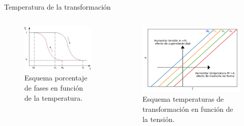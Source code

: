 \documentclass[11pt]{beamer}
\begin{document}
		\begin{frame}{Temperatura de la transformación}
			\begin{columns}[T]
				\begin{column}{.49\textwidth}
					\begin{figure}
						\includegraphics[scale=0.5]{img/Sma_wire.jpeg}
						\caption*{Esquema porcentaje de fases en función de la temperatura.}
					\end{figure}
				\end{column}
				\begin{column}{.49\textwidth}
					\begin{figure}
						\includegraphics[scale=0.3]{img/TvsStress.png}
						\caption*{Esquema temperaturas de transformación en función de la tensión.}					
					\end{figure}
				\end{column}
			\end{columns}
		\end{frame}
		
\end{document}
